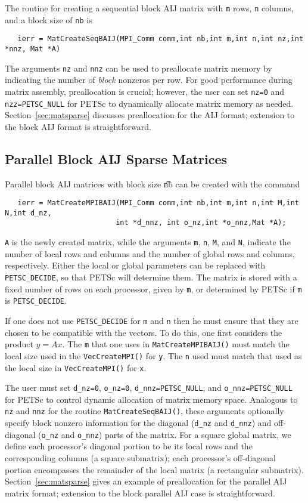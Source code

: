 The routine for creating a sequential block AIJ matrix with {\tt m} 
rows, {\tt n} columns, and a block size of {\tt nb} is
\begin{verbatim}
   ierr = MatCreateSeqBAIJ(MPI_Comm comm,int nb,int m,int n,int nz,int *nnz, Mat *A)
\end{verbatim}
The arguments {\tt nz} and {\tt nnz} can be used to preallocate matrix
memory by indicating the number of {\em block} nonzeros per row.  For good
performance during matrix assembly, preallocation is crucial; however, the
user can set {\tt nz=0} and {\tt nzz=PETSC\_NULL} for PETSc to dynamically
allocate matrix memory as needed.  Section~\ref{sec:matsparse}
discusses preallocation for the AIJ format; extension to the block AIJ
format is straightforward.

\subsection{Parallel Block AIJ Sparse Matrices}

Parallel block AIJ matrices with block size {\t nb} can be created with
the command 
\begin{verbatim}
   ierr = MatCreateMPIBAIJ(MPI_Comm comm,int nb,int m,int n,int M,int N,int d_nz,
                          int *d_nnz, int o_nz,int *o_nnz,Mat *A);
\end{verbatim}
{\tt A} is the newly created matrix, while the arguments {\tt m}, {\tt n}, 
{\tt M}, and {\tt N}, indicate the number of local rows and columns and
the number of global rows and columns, respectively. Either the local or
global parameters can be replaced with {\tt PETSC\_DECIDE}, so that 
PETSc will determine  them.
The matrix is stored with a fixed number of rows on 
each processor, given by {\tt m}, or determined by PETSc if {\tt m} is
{\tt PETSC\_DECIDE}.

If one does not use {\tt PETSC\_DECIDE} for
{\tt m} and {\tt n} then he must ensure that they are chosen to be
compatible with the vectors. To do this, one first considers the product 
$y = A x$. The {\tt m} that one uses in {\tt MatCreateMPIBAIJ()}
must match the local size used in the {\tt VecCreateMPI()} for {\tt y}.
The {\tt n} used must match that used as the local size in 
{\tt VecCreateMPI()} for {\tt x}. 

The user must set {\tt d\_nz=0}, {\tt o\_nz=0}, {\tt d\_nnz=PETSC\_NULL}, and 
{\tt o\_nnz=PETSC\_NULL} for PETSc to control dynamic allocation of matrix
memory space.  Analogous to {\tt nz} and {\tt nnz} for the routine 
{\tt MatCreateSeqBAIJ()}, these arguments optionally specify 
block nonzero information for the diagonal ({\tt d\_nz} and {\tt d\_nnz}) and 
off-diagonal ({\tt o\_nz} and {\tt o\_nnz}) parts of the matrix. 
For a square global matrix, we define each processor's diagonal portion 
to be its local rows and the corresponding columns (a square submatrix);  
each processor's off-diagonal portion encompasses the remainder of the
local matrix (a rectangular submatrix).  
Section~\ref{sec:matsparse} gives an example of preallocation for
the parallel AIJ matrix format; extension to the block parallel AIJ case
is straightforward.

